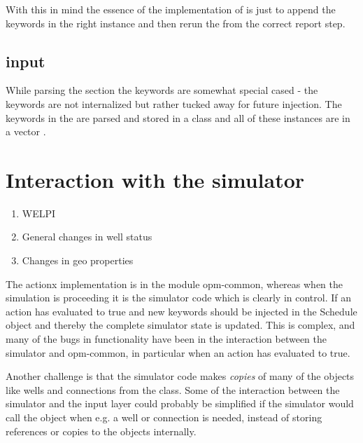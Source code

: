 With this in mind the essence of the implementation of \actionx{} is just to
append the \actionx{} keywords in the right  instance
and then rerun the  from the
correct report step.

\subsection*{\actionx{} input}
While parsing the  section the \actionx{} keywords are somewhat
special cased - the keywords are not internalized but rather tucked away for
future injection. The keywords in the \actionx{} are parsed and stored in a
class  and all of these instances are in a vector
.


\section{Interaction with the simulator}

\begin{enumerate}
\item WELPI
\item General changes in well status
\item Changes in geo properties
\end{enumerate}

The actionx implementation is in the module opm-common, whereas when the
simulation is proceeding it is the simulator code which is clearly in control.
If an action has evaluated to true and new keywords should be injected in the
Schedule object and thereby the complete simulator state is updated. This is
complex, and many of the bugs in \actionx{} functionality have been in the
interaction between the simulator and opm-common, in particular when an action
has evaluated to true.

Another challenge is that the simulator code makes \emph{copies} of many of the
objects like wells and connections from the  class. Some of
the interaction between the simulator and the input layer could probably be
simplified if the simulator would call the  object when
e.g. a well or connection is needed, instead of storing references or copies to
the  objects internally.

